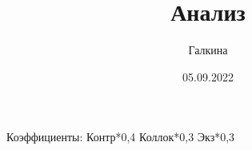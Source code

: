 \documentclass[a4paper]{article}
\author{Галкина}
\title{Анализ}
\date{05.09.2022}
\begin{document}
\maketitle
\tableofcontents
\newpage
Коэффициенты: Контр*0,4 Коллок*0,3 Экз*0,3
%


\end{document}
